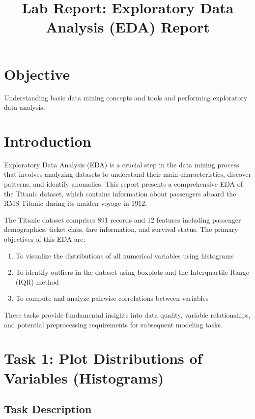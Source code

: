 \documentclass[12pt,a4paper]{article}
\title{\textbf{Lab Report: Exploratory Data Analysis (EDA) Report} }
\begin{document}
\maketitle

\section{Objective}
Understanding basic data mining concepts and tools and performing exploratory data analysis.
\section{Introduction}

Exploratory Data Analysis (EDA) is a crucial step in the data mining process that involves analyzing datasets to understand their main characteristics, discover patterns, and identify anomalies. This report presents a comprehensive EDA of the Titanic dataset, which contains information about passengers aboard the RMS Titanic during its maiden voyage in 1912.

The Titanic dataset comprises 891 records and 12 features including passenger demographics, ticket class, fare information, and survival status. The primary objectives of this EDA are:

\begin{enumerate}
    \item To visualize the distributions of all numerical variables using histograms
    \item To identify outliers in the dataset using boxplots and the Interquartile Range (IQR) method
    \item To compute and analyze pairwise correlations between variables
\end{enumerate}

These tasks provide fundamental insights into data quality, variable relationships, and potential preprocessing requirements for subsequent modeling tasks.



\section{Task 1: Plot Distributions of Variables (Histograms)}

\subsection{Task Description}
\end{document}
